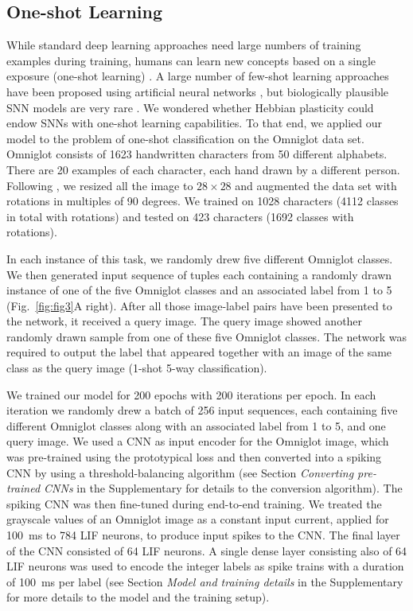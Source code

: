 \documentclass{article}
\begin{document}
\subsection*{One-shot Learning}
\label{sec:results-one_shot_learning}
While standard deep learning approaches need large numbers of training examples during training, humans can learn new concepts based on a single exposure (one-shot learning) \cite{lake2017building}. A large number of few-shot learning approaches have been proposed using artificial neural networks \cite{snell2017prototypical,finn2017model}, but biologically plausible SNN models are very rare \cite{scherr2020one}. We wondered whether Hebbian plasticity could endow SNNs with one-shot learning capabilities.   
To that end, we applied our model to the problem of one-shot classification on the Omniglot \cite{lake2015human} data set. Omniglot consists of \num{1623} handwritten characters from \num{50} different alphabets. There are \num{20} examples of each character, each hand drawn by a different person. Following \cite{vinyals2016matching}, we resized all the image to $28 \times 28$ and augmented the data set with rotations in multiples of \num{90} degrees. We trained on \num{1028} characters (\num{4112} classes in total with rotations) and tested on \num{423} characters (\num{1692} classes with rotations).

In each instance of this task, we randomly drew five different Omniglot classes. We then generated input sequence of tuples each containing a randomly drawn instance of one of the five Omniglot classes and an associated label from \num{1} to \num{5} (Fig.~\ref{fig:fig3}A right). After all those image-label pairs have been presented to the network, it received a query image. The query image showed another randomly drawn sample from one of these five Omniglot classes. The network was required to output the label that appeared together with an image of the same class as the query image (\num{1}-shot \num{5}-way classification).

We trained our model for \num{200} epochs with \num{200} iterations per epoch. In each iteration we randomly drew a batch of \num{256} input sequences, each containing five different Omniglot classes along with an associated label from \num{1} to \num{5}, and one query image. We used a \gls{CNN} as input encoder for the Omniglot image, which was pre-trained using the prototypical loss \cite{snell2017prototypical} and then converted into a spiking \gls{CNN} by using a threshold-balancing algorithm \cite{diehl2015fast,sengupta2019going} (see Section \emph{Converting pre-trained CNNs} in the Supplementary for details to the conversion algorithm). The spiking \gls{CNN} was then fine-tuned during end-to-end training. We treated the grayscale values of an Omniglot image as a constant input current, applied for \SI{100}{\ms} to \num{784} \gls{LIF} neurons, to produce input spikes to the \gls{CNN}. The final layer of the \gls{CNN} consisted of \num{64} \gls{LIF} neurons. A single dense layer consisting also of \num{64} \gls{LIF} neurons was used to encode the integer labels as spike trains with a duration of \SI{100}{\ms} per label (see Section \emph{Model and training details} in the Supplementary for more details to the model and the training setup).
\end{document}
